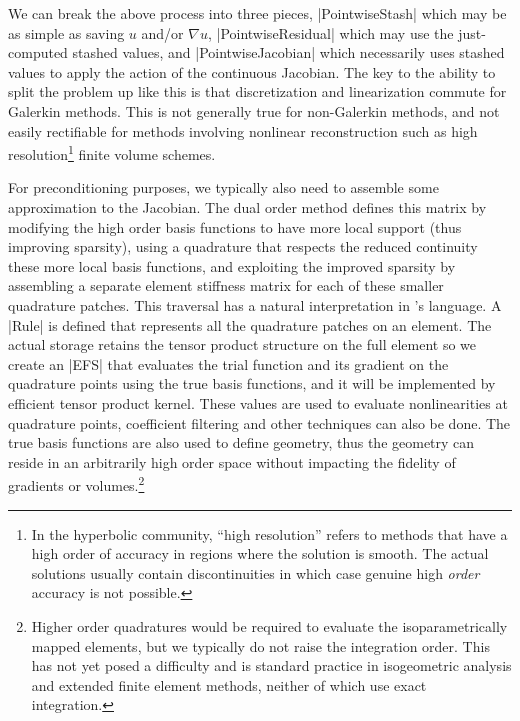 We can break the above process into three pieces, \cverb|PointwiseStash| which may be as simple as saving $u$ and/or $\nabla u$, \cverb|PointwiseResidual| which may use the just-computed stashed values, and \cverb|PointwiseJacobian| which necessarily uses stashed values to apply the action of the continuous Jacobian.
The key to the ability to split the problem up like this is that discretization and linearization commute for Galerkin methods.
This is not generally true for non-Galerkin methods, and not easily rectifiable for methods involving nonlinear reconstruction such as high resolution\footnote{In the hyperbolic community, ``high resolution'' refers to methods that have a high order of accuracy in regions where the solution is smooth. The actual solutions usually contain discontinuities in which case genuine high \emph{order} accuracy is not possible.} finite volume schemes.

For preconditioning purposes, we typically also need to assemble some approximation to the Jacobian.
The dual order method defines this matrix by modifying the high order basis functions to have more local support (thus improving sparsity), using a quadrature that respects the reduced continuity these more local basis functions, and exploiting the improved sparsity by assembling a separate element stiffness matrix for each of these smaller quadrature patches.
This traversal has a natural interpretation in \Dohp's language.
A \cverb|Rule| is defined that represents all the quadrature patches on an element.
The actual storage retains the tensor product structure on the full element so we create an \cverb|EFS| that evaluates the trial function and its gradient on the quadrature points using the true basis functions, and it will be implemented by efficient tensor product kernel.
These values are used to evaluate nonlinearities at quadrature points, coefficient filtering and other techniques can also be done.
The true basis functions are also used to define geometry, thus the geometry can reside in an arbitrarily high order space without impacting the fidelity of gradients or volumes.\footnote{Higher order quadratures would be required to evaluate the isoparametrically mapped elements, but we typically do not raise the integration order. This has not yet posed a difficulty and is standard practice in isogeometric analysis and extended finite element methods, neither of which use exact integration.}

